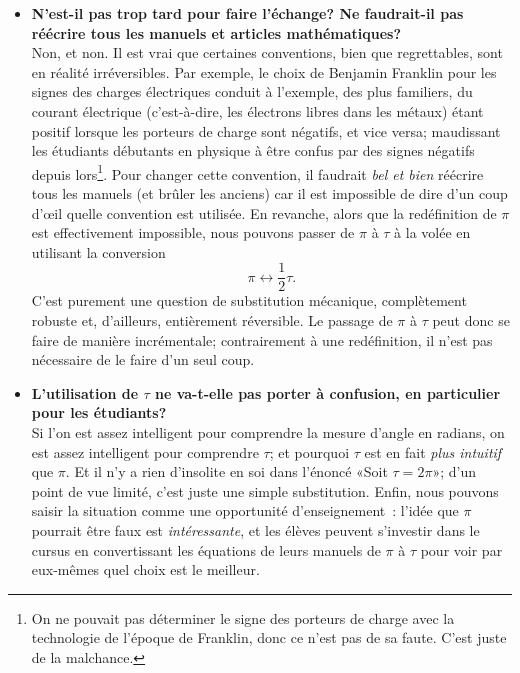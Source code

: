 \begin{itemize}
  \item \textbf{N'est-il pas trop tard pour faire l'échange\ns? Ne faudrait-il pas
  réécrire tous les manuels et articles mathématiques\ns?} \\ Non, et non.
  Il est vrai que certaines conventions, bien que regrettables, sont
  en réalité irréversibles. Par exemple, le choix de Benjamin Franklin pour
  les signes des charges électriques conduit à l'exemple, des plus familiers, du
  courant électrique (c'est-à-dire, les électrons libres dans les métaux) étant
  positif lorsque les porteurs de charge sont négatifs, et vice
  versa\ns; maudissant les étudiants débutants en physique à être confus
  par des signes négatifs depuis lors\ns\footnote{On ne pouvait pas déterminer le signe
  des porteurs de charge avec la technologie de l'époque de Franklin, donc ce
  n'est pas de sa faute. C'est juste de la malchance.}. Pour changer cette
  convention, il faudrait \emph{bel et bien} réécrire tous les manuels (et brûler les
  anciens) car il est impossible de dire d'un coup d'œil quelle convention est
  utilisée. En revanche, alors que la redéfinition de $\pi$ est effectivement
  impossible, nous pouvons passer de $\pi$ à $\tau$ à la volée en utilisant la
  conversion \[ \pi \leftrightarrow \textstyle{\frac{1}{2}}\tau. \] C'est
  purement une question de substitution mécanique, complètement robuste et,
  d'ailleurs, entièrement réversible. Le passage de $\pi$ à $\tau$ peut donc se faire
  de manière incrémentale\ns; contrairement à une redéfinition, il n'est pas
  nécessaire de le faire d'un seul coup.

  \item \textbf{L'utilisation de $\tau$ ne va-t-elle pas porter à confusion, en
  particulier pour les étudiants\ns?} \\ Si l'on est assez intelligent pour
  comprendre la mesure d'angle en radians, on est assez intelligent pour
  comprendre $\tau$\ns; et pourquoi $\tau$ est en fait \emph{plus intuitif} que
  $\pi$. Et il n'y a rien d'insolite en soi dans l'énoncé
  «\ns Soit $\tau=2\pi$\ns »\ns; d'un point de vue limité, c'est juste une simple
  substitution. Enfin, nous pouvons saisir la situation comme une opportunité
  d'enseignement~: l'idée que $\pi$ pourrait être faux est
  \emph{intéressante}, et les élèves peuvent s'investir dans le cursus en
  convertissant les équations de leurs manuels de $\pi$ à $\tau$ pour voir par
  eux-mêmes quel choix est le meilleur.


\end{itemize}
